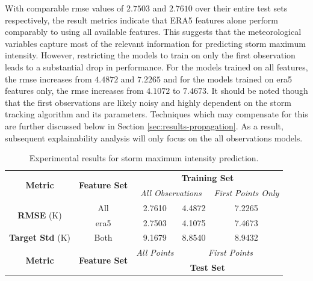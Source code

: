 With comparable \acrshort{rmse} values of $2.7503$ and $2.7610$ over their entire test sets respectively, the result metrics indicate that ERA5 features alone perform comparably to using all available features. This suggests that the meteorological variables capture most of the relevant information for predicting storm maximum intensity. However, restricting the models to train on only the first observation leads to a substantial drop in performance. For the models trained on all features, the \acrshort{rmse} increases from $4.4872$ and $7.2265$ and for the models trained on \acrshort{era5} features only, the \acrshort{rmse} increases from $4.1072$ to $7.4673$. It should be noted though that the first observations are likely noisy and highly dependent on the storm tracking algorithm and its parameters. Techniques which may compensate for this are further discussed below in Section \ref{sec:results-propagation}. As a result, subsequent explainability analysis will only focus on the all observations models.

\begin{table}[ht]
\centering
\caption{Experimental results for storm maximum intensity prediction.}
\label{tab:storm_max_intensity_results}
\begin{tabular}{|c|c|c|c|c|}
\hline
\multirow{2}{*}{\textbf{Metric}} & \multirow{2}{*}{\textbf{Feature Set}} & \multicolumn{3}{c|}{\textbf{Training Set} } \\ \cline{3-5}
 & & \multicolumn{2}{c|}{\textit{All Observations}} & \textit{First Points Only} \\
\hline \hline
\multirow{2}{*}{\textbf{RMSE} (\unit{\kelvin})} & All & 2.7610 & 4.4872 & 7.2265 \\
 & \acrshort{era5} & 2.7503 & 4.1075 & 7.4673 \\
\hline
\textbf{Target Std} (\unit{\kelvin}) & Both & 9.1679 & 8.8540 & 8.9432 \\
\hline \hline
\multirow{2}{*}{\textbf{Metric}} & \multirow{2}{*}{\textbf{Feature Set}} & \textit{All Points} & \multicolumn{2}{c|}{\textit{First Points}} \\ \cline{3-5}
 & & \multicolumn{3}{c|}{\textbf{Test Set}} \\ 
\hline
\end{tabular}
\end{table}

